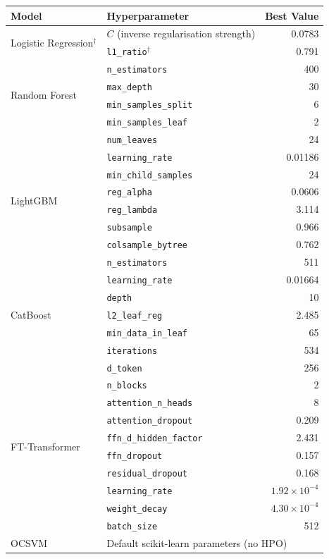 \par\medskip\noindent\begin{minipage}{\linewidth}\centering
\small
{}
\label{tab:hyperparams_ulb}
\begin{tabular}{l l r}
\toprule
Model & Hyperparameter & Best Value \\
\midrule
\multirow{2}{*}{Logistic Regression$^\dagger$}
  & $C$ (inverse regularisation strength) & 0.0783 \\
  & \texttt{l1\_ratio}$^\dagger$ & 0.791 \\
\midrule
\multirow{4}{*}{Random Forest}
  & \texttt{n\_estimators} & 400 \\
  & \texttt{max\_depth} & 30 \\
  & \texttt{min\_samples\_split} & 6 \\
  & \texttt{min\_samples\_leaf} & 2 \\
\midrule
\multirow{8}{*}{LightGBM}
  & \texttt{num\_leaves} & 24 \\
  & \texttt{learning\_rate} & 0.01186 \\
  & \texttt{min\_child\_samples} & 24 \\
  & \texttt{reg\_alpha} & 0.0606 \\
  & \texttt{reg\_lambda} & 3.114 \\
  & \texttt{subsample} & 0.966 \\
  & \texttt{colsample\_bytree} & 0.762 \\
  & \texttt{n\_estimators} & 511 \\
\midrule
\multirow{5}{*}{CatBoost}
  & \texttt{learning\_rate} & 0.01664 \\
  & \texttt{depth} & 10 \\
  & \texttt{l2\_leaf\_reg} & 2.485 \\
  & \texttt{min\_data\_in\_leaf} & 65 \\
  & \texttt{iterations} & 534 \\
\midrule
\multirow{10}{*}{FT-Transformer}
  & \texttt{d\_token} & 256 \\
  & \texttt{n\_blocks} & 2 \\
  & \texttt{attention\_n\_heads} & 8 \\
  & \texttt{attention\_dropout} & 0.209 \\
  & \texttt{ffn\_d\_hidden\_factor} & 2.431 \\
  & \texttt{ffn\_dropout} & 0.157 \\
  & \texttt{residual\_dropout} & 0.168 \\
  & \texttt{learning\_rate} & $1.92 \times 10^{-4}$ \\
  & \texttt{weight\_decay} & $4.30 \times 10^{-4}$ \\
  & \texttt{batch\_size} & 512 \\
\midrule
OCSVM & \multicolumn{2}{l}{Default scikit-learn parameters (no HPO)} \\
\bottomrule
\end{tabular}
\end{minipage}\par\medskip

